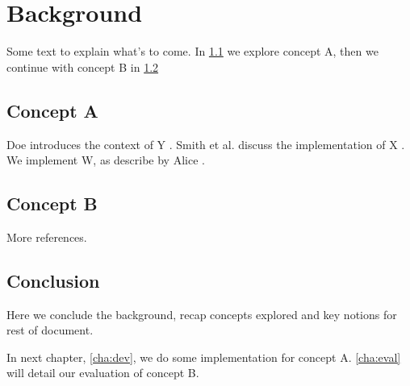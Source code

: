 \chapter{Background}
\label{cha:back}

Some text to explain what's to come. In \cref{sec:back_A} we explore concept A, then we continue with concept B in \cref{sec:back_B}

\section{Concept A}
\label{sec:back_A}

Doe introduces the context of Y \cite{doe2017exploring}. Smith et al. discuss the implementation of X \cite{smith2018implementing}. We implement W, as describe by Alice \cite{alice2016handbook}.

\section{Concept B}
\label{sec:back_B}

More references.

\section{Conclusion}
\label{sec:back_concl}

Here we conclude the background, recap concepts explored and key notions for rest of document.

In next chapter, \cref{cha:dev}, we do some implementation for concept A. \cref{cha:eval} will detail our evaluation of concept B.